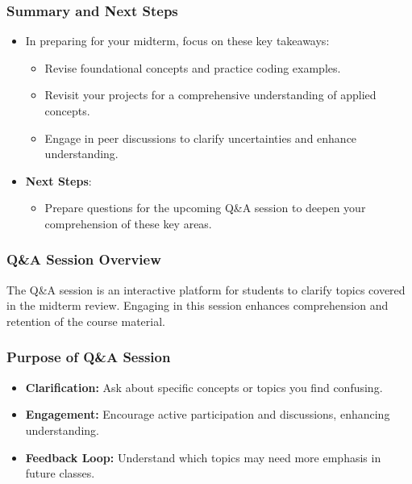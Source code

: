 \documentclass[aspectratio=169]{beamer}
\begin{document}
\begin{frame}
    \frametitle{Summary and Next Steps}
    \begin{itemize}
        \item In preparing for your midterm, focus on these key takeaways:
        \begin{itemize}
            \item Revise foundational concepts and practice coding examples.
            \item Revisit your projects for a comprehensive understanding of applied concepts.
            \item Engage in peer discussions to clarify uncertainties and enhance understanding.
        \end{itemize}
        \item \textbf{Next Steps}:
        \begin{itemize}
            \item Prepare questions for the upcoming Q\&A session to deepen your comprehension of these key areas.
        \end{itemize}
    \end{itemize}
\end{frame}

\begin{frame}[fragile]
    \frametitle{Q\&A Session Overview}
    The Q\&A session is an interactive platform for students to clarify topics covered in the midterm review. 
    Engaging in this session enhances comprehension and retention of the course material. 
\end{frame}

\begin{frame}[fragile]
    \frametitle{Purpose of Q\&A Session}
    \begin{itemize}
        \item \textbf{Clarification:} Ask about specific concepts or topics you find confusing.
        \item \textbf{Engagement:} Encourage active participation and discussions, enhancing understanding.
        \item \textbf{Feedback Loop:} Understand which topics may need more emphasis in future classes.
    \end{itemize}
\end{frame}
\end{document}
